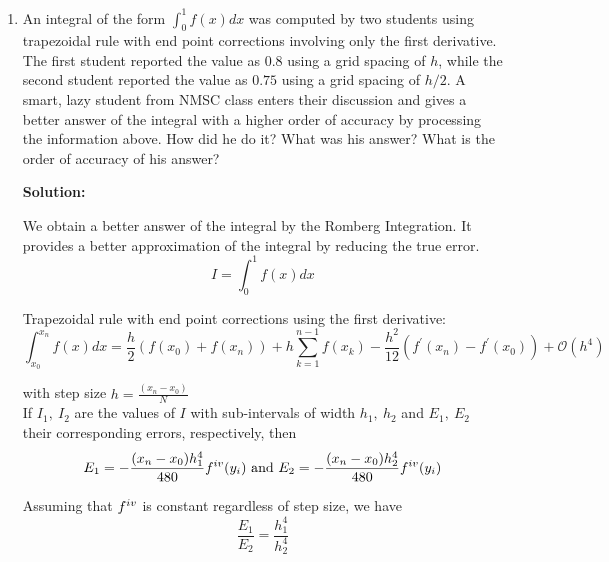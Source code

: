\documentclass[a4paper,11pt]{report}
\begin{document}
\doublespacing
\begin{enumerate}

    \item An integral of the form $\displaystyle \int_{0}^{1} f(x) dx$ was 
    computed by two students using trapezoidal rule with end point corrections 
    involving only the first derivative. The first student reported the value 
    as $0.8$ using a grid spacing of $h$, while the second student reported the
    value as $0.75$ using a grid spacing of $h/2$. A smart, lazy student from 
    NMSC class enters their discussion and gives a better answer of the 
    integral with a higher order of accuracy by processing the information 
    above. How did he do it? What was his answer? What is the order of accuracy
    of his answer?

    \textbf{Solution:}
    
    We obtain a better answer of the integral by the Romberg Integration. 
    It provides a better approximation of the integral by reducing the true 
    error.
    \begin{equation*}
    I = \int_{0}^{1} f(x) dx
    \end{equation*}    

    Trapezoidal rule with end point corrections using the first derivative:
    \begin{equation*}
    \int_{x_{0}}^{x_{n}} f(x) dx = \frac{h}{2} \left( f(x_{0}) + f(x_{n}) 
    \right) + h \sum_{k=1}^{n-1} f(x_{k}) - \frac{h^{2}}{12} \left( f^{\prime}
    (x_{n}) - f^{\prime}(x_{0}) \right) + \mathcal{O}(h^{4})
    \end{equation*} 
    
    with step size $h = \displaystyle \frac{(x_{n} - x_{0})}{N}$ \\
    
    If $I_{1},\ I_{2}$ are the values of $I$ with sub-intervals of width 
    $h_{1},\ h_{2}$ and $E_{1},\ E_{2}$ their corresponding errors, 
    respectively, then
    \begin{equation*}
    E_{1} = - \frac{(x_{n} - x_{0})h_{1}^{4}}{480} f^{\romannumeral 4} 
    (y_{i}) \ \text{and} \ E_{2} = - \frac{(x_{n} - x_{0})h_{2}^{4}}{480} 
    f^{\romannumeral 4} (y_{i})
    \end{equation*}

    Assuming that $f^{\romannumeral 4}$ is constant regardless of step size, 
    we have
    \begin{equation*}
    \frac{E_{1}}{E_{2}} = \frac{h_{1}^4}{h_{2}^4}
    \end{equation*}


\end{enumerate}
\end{document}
